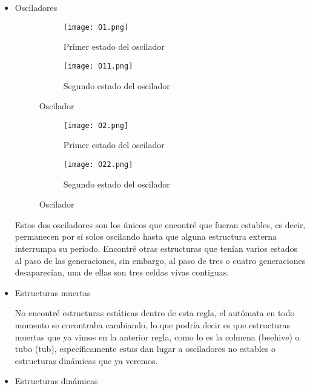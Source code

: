 \documentclass{article}
\begin{document}
 	 \begin{itemize}
 	 	\item Osciladores
 	 	
 	 	\begin{figure}[htbp]
 	 		\centering
 	 		\begin{subfigure}{0.48\textwidth}
 	 			\centering
 	 			\texttt{[image: O1.png]}
 	 			\caption{Primer estado del oscilador}
 	 			\label{fig:A547}
 	 		\end{subfigure}
 	 		\hfill
 	 		\begin{subfigure}{0.48\textwidth}
 	 			\centering
 	 			\texttt{[image: O11.png]}
 	 			\caption{Segundo estado del oscilador}
 	 			\label{fig:A6}
 	 		\end{subfigure}
 	 		\caption{Oscilador}
 	 		\label{fig:A77}
 	 	\end{figure}
 	 	
 	 		\begin{figure}[htbp]
 	 		\centering
 	 		\begin{subfigure}{0.48\textwidth}
 	 			\centering
 	 			\texttt{[image: O2.png]}
 	 			\caption{Primer estado del oscilador}
 	 			\label{fig:A547}
 	 		\end{subfigure}
 	 		\hfill
 	 		\begin{subfigure}{0.48\textwidth}
 	 			\centering
 	 			\texttt{[image: O22.png]}
 	 			\caption{Segundo estado del oscilador}
 	 			\label{fig:A6}
 	 		\end{subfigure}
 	 		\caption{Oscilador}
 	 		\label{fig:A77}
 	 	\end{figure}
 	 	
 	 	Estos dos osciladores son los únicos que encontré que fueran estables, es decir, permanecen por sí solos oscilando hasta que alguna estructura externa interrumpa su periodo. Encontré otras estructuras que tenían varios estados al paso de las generaciones, sin embargo, al paso de tres o cuatro generaciones desaparecían, una de ellas son tres celdas vivas contiguas. 
 	 	
 	 	\item Estructuras muertas
 	 	
 	 	No encontré estructuras estáticas dentro de esta regla, el autómata en todo momento se encontraba cambiando, lo que podría decir es que estructuras muertas que ya vimos en la anterior regla, como lo es la colmena (beehive) o tubo (tub), específicamente estas dan lugar a osciladores no estables o estructuras dinámicas que ya veremos. 
 	 	\vspace{100pt}
 	 	\item Estructuras dinámicas
 	 	

\end{itemize}
\end{document}
